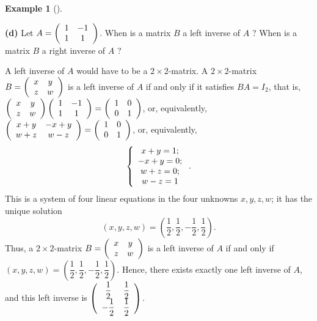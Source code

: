 \documentclass[numbers=enddot,12pt,final,onecolumn,notitlepage]{scrartcl}%
\theoremstyle{definition}
\newtheorem{exam}[theo]{Example}
\newenvironment{example}[1][]
{\begin{exam}[#1]\begin{leftbar}}
{\end{leftbar}\end{exam}}
\begin{document}
\begin{example}
\textbf{(d)} Let $A=\left(
\begin{array}
[c]{cc}%
1 & -1\\
1 & 1
\end{array}
\right)  $. When is a matrix $B$ a left inverse of $A$ ? When is a matrix $B$
a right inverse of $A$ ?

A left inverse of $A$ would have to be a $2\times2$-matrix. A $2\times
2$-matrix $B=\left(
\begin{array}
[c]{cc}%
x & y\\
z & w
\end{array}
\right)  $ is a left inverse of $A$ if and only if it satisfies $BA=I_{2}$,
that is, $\left(
\begin{array}
[c]{cc}%
x & y\\
z & w
\end{array}
\right)  \left(
\begin{array}
[c]{cc}%
1 & -1\\
1 & 1
\end{array}
\right)  =\left(
\begin{array}
[c]{cc}%
1 & 0\\
0 & 1
\end{array}
\right)  $, or, equivalently, $\left(
\begin{array}
[c]{cc}%
x+y & -x+y\\
w+z & w-z
\end{array}
\right)  =\left(
\begin{array}
[c]{cc}%
1 & 0\\
0 & 1
\end{array}
\right)  $, or, equivalently,%
\[
\left\{
\begin{array}
[c]{c}%
x+y=1;\\
-x+y=0;\\
w+z=0;\\
w-z=1
\end{array}
\right.  .
\]
This is a system of four linear equations in the four unknowns $x,y,z,w$; it
has the unique solution%
\[
\left(  x,y,z,w\right)  =\left(  \dfrac{1}{2},\dfrac{1}{2},-\dfrac{1}%
{2},\dfrac{1}{2}\right)  .
\]
Thus, a $2\times2$-matrix $B=\left(
\begin{array}
[c]{cc}%
x & y\\
z & w
\end{array}
\right)  $ is a left inverse of $A$ if and only if $\left(  x,y,z,w\right)
=\left(  \dfrac{1}{2},\dfrac{1}{2},-\dfrac{1}{2},\dfrac{1}{2}\right)  $.
Hence, there exists exactly one left inverse of $A$, and this left inverse is
$\left(
\begin{array}
[c]{cc}%
\dfrac{1}{2} & \dfrac{1}{2}\\
-\dfrac{1}{2} & \dfrac{1}{2}%
\end{array}
\right)  $.


\end{example}
\end{document}
